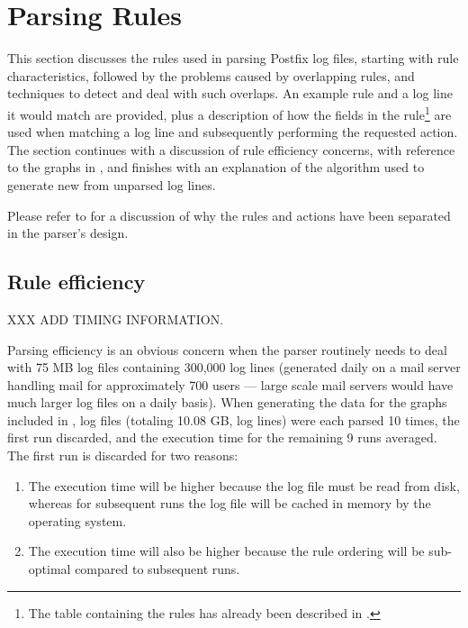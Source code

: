 \section{Parsing Rules}

\label{rules}

This section discusses the rules used in parsing Postfix log files,
starting with rule characteristics, followed by the problems caused by
overlapping rules, and techniques to detect and deal with such overlaps.
An example rule and a log line it would match are provided, plus a
description of how the fields in the rule\footnote{The table containing the
rules has already been described in .} are used
when matching a log line and subsequently performing the requested action.
The section continues with a discussion of rule efficiency concerns, with
reference to the graphs in , and finishes with an
explanation of the algorithm used to generate new \regexes{} from unparsed
log lines.

Please refer to  for a discussion of why the
rules and actions have been separated in the parser's design.

\subsection{Rule efficiency}

\label{rule efficiency}

XXX ADD TIMING INFORMATION\@.

Parsing efficiency is an obvious concern when the parser routinely needs to
deal with 75 MB log files containing 300,000 log lines (generated daily on
a mail server handling mail for approximately 700 users --- large scale
mail servers would have much larger log files on a daily basis).  When
generating the data for the graphs included in ,
\numberOFlogFILES{} log files (totaling 10.08 GB, \numberOFlogLINEShuman{}
log lines) were each parsed 10 times, the first run discarded, and the
execution time for the remaining 9 runs averaged.  The first run is
discarded for two reasons:

\begin{enumerate}

    \item The execution time will be higher because the log file must be
        read from disk, whereas for subsequent runs the log file will be
        cached in memory by the operating system.

    \item The execution time will also be higher because the rule ordering
        will be sub-optimal compared to subsequent runs.

\end{enumerate}


